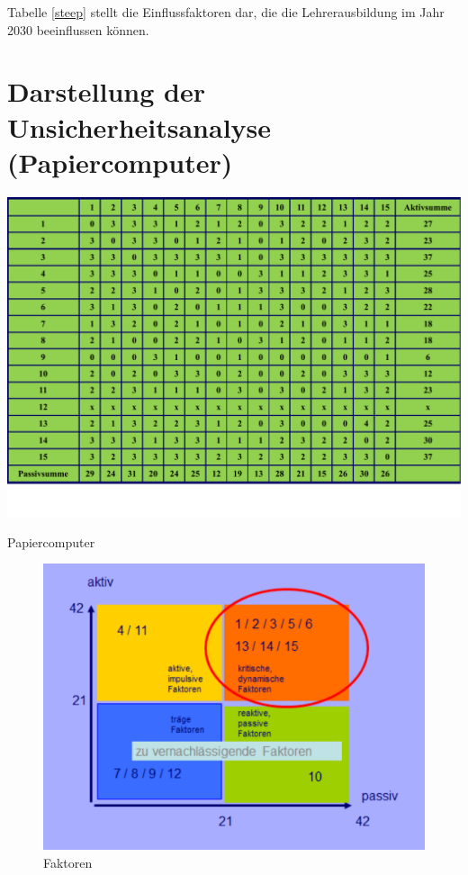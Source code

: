 \documentclass[12pt,a4paper]{article}
\begin{document}
Tabelle \ref{steep} stellt die Einflussfaktoren dar, die die Lehrerausbildung im Jahr 2030 beeinflussen können.

\section{Darstellung der Unsicherheitsanalyse (Papiercomputer)}
\begin{table}[!ht]
\begin{center}
\includegraphics[scale=0.85,angle=90]{tabelle.pdf}
\caption{Papiercomputer}
\end{center}
\label{tabelle}
\end{table}
\FloatBarrier


\begin{figure}[!ht]
\begin{center}
\includegraphics[scale=0.95,angle=90]{faktoren.pdf}
\caption{Faktoren}
\end{center}
\label{faktoren}
\end{figure}
\FloatBarrier
\end{document}

